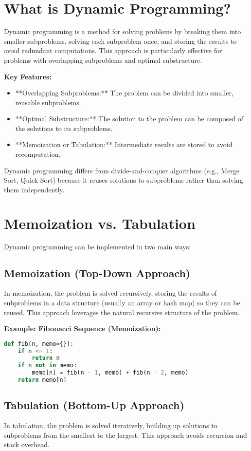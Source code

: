 \section*{What is Dynamic Programming?}

Dynamic programming is a method for solving problems by breaking them into smaller subproblems, solving each subproblem once, and storing the results to avoid redundant computations. This approach is particularly effective for problems with overlapping subproblems and optimal substructure.

\textbf{Key Features:}
\begin{itemize}
    \item **Overlapping Subproblems:** The problem can be divided into smaller, reusable subproblems.
    \item **Optimal Substructure:** The solution to the problem can be composed of the solutions to its subproblems.
    \item **Memoization or Tabulation:** Intermediate results are stored to avoid recomputation.
\end{itemize}

Dynamic programming differs from divide-and-conquer algorithms (e.g., Merge Sort, Quick Sort) because it reuses solutions to subproblems rather than solving them independently.

\section*{Memoization vs. Tabulation}

Dynamic programming can be implemented in two main ways:

\subsection*{Memoization (Top-Down Approach)}
In memoization, the problem is solved recursively, storing the results of subproblems in a data structure (usually an array or hash map) so they can be reused. This approach leverages the natural recursive structure of the problem.

\textbf{Example: Fibonacci Sequence (Memoization):}
\begin{lstlisting}[language=Python]
def fib(n, memo={}):
    if n <= 1:
        return n
    if n not in memo:
        memo[n] = fib(n - 1, memo) + fib(n - 2, memo)
    return memo[n]
\end{lstlisting}

\subsection*{Tabulation (Bottom-Up Approach)}
In tabulation, the problem is solved iteratively, building up solutions to subproblems from the smallest to the largest. This approach avoids recursion and stack overhead.

